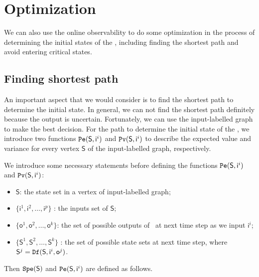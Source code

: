 \section{Optimization}
\label{sec:app}

We can also use the online observability to do some optimization in the process of determining the initial states of the \BCNs, including finding the shortest path and avoid entering critical states. 

\subsection{Finding shortest path}
An important aspect that we would consider is to find the shortest path to determine the initial state. In general, we can not find the shortest path definitely because the output is uncertain. Fortunately, we can use the input-labelled graph to make the best decision. For the path to determine the initial state of the \BCNs, we introduce two functions ${\tt Pe}(\mathsf{S},\mathsf{ i}^{i})$ and ${\tt Pv}(\mathsf{S},\mathsf{ i}^{i})$ to describe the expected value and variance for every vertex $\mathsf{S}$ of the input-labelled graph, respectively.%

We introduce some necessary statements before defining the functions ${\tt Pe}(\mathsf{S},\mathsf{ i}^{i})$ and ${\tt Pv}(\mathsf{S},\mathsf{ i}^{i})$:
\begin{itemize}
  \item $\mathsf{S}$: the state set in a vertex of input-labelled graph;
  \item $\{\mathsf{ i}^{1},\mathsf{ i}^{2},\ldots, \mathsf{ i}^{p}\}$ : the inputs set of $\mathsf{S}$;
  \item $\{\mathsf{o}^1,\mathsf{o}^2,\ldots,\mathsf{o}^k\}$: the set of possible outputs of \BCN\ at next time step as we input $\mathsf{ i}^{i}$;
 \item $\{\mathsf{S}^{1},\mathsf{S}^{2},\ldots, \mathsf{S}^{k}\}$ : the set of possible state sets at next time step, where $\mathsf{S}^{j}={\tt Df}(\mathsf{S},\mathsf{i}^{i},\mathsf{o}^{j})$.
  
\end{itemize} 

Then ${\tt Spe}(\mathsf{S})$ and ${\tt Pe}(\mathsf{S},\mathsf{ i}^{i})$ are defined as follows.

